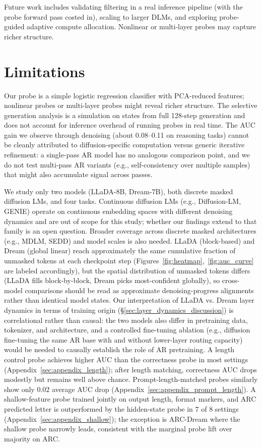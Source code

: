 \documentclass[11pt]{article}
\begin{document}
Future work includes validating filtering in a real inference pipeline (with the probe forward pass costed in), scaling to larger DLMs, and exploring probe-guided adaptive compute allocation.
Nonlinear or multi-layer probes may capture richer structure.

\section*{Limitations}

Our probe is a simple logistic regression classifier with PCA-reduced features; nonlinear probes or multi-layer probes might reveal richer structure.
The selective generation analysis is a simulation on states from full 128-step generation and does not account for inference overhead of running probes in real time.
The AUC gain we observe through denoising (about 0.08--0.11 on reasoning tasks) cannot be cleanly attributed to diffusion-specific computation versus generic iterative refinement: a single-pass AR model has no analogous comparison point, and we do not test multi-pass AR variants (e.g., self-consistency over multiple samples) that might also accumulate signal across passes.

We study only two models (LLaDA-8B, \mbox{Dream-7B}), both discrete masked diffusion LMs, and four tasks. Continuous diffusion LMs (e.g., Diffusion-LM, GENIE) operate on continuous embedding spaces with different denoising dynamics and are out of scope for this study; whether our findings extend to that family is an open question. Broader coverage across discrete masked architectures (e.g., MDLM, SEDD) and model scales is also needed.
LLaDA (block-based) and Dream (global linear) reach approximately the same cumulative fraction of unmasked tokens at each checkpoint step (Figures~\ref{fig:heatmap},~\ref{fig:auc_curve} are labeled accordingly), but the spatial distribution of unmasked tokens differs (LLaDA fills block-by-block, Dream picks most-confident globally), so cross-model comparisons should be read as approximate denoising-progress alignments rather than identical model states.
Our interpretation of LLaDA vs. Dream layer dynamics in terms of training origin (\S\ref{sec:layer_dynamics_discussion}) is correlational rather than causal: the two models also differ in pretraining data, tokenizer, and architecture, and a controlled fine-tuning ablation (e.g., diffusion fine-tuning the same AR base with and without lower-layer routing capacity) would be needed to causally establish the role of AR pretraining.
A length control probe achieves higher AUC than the correctness probe in most settings (Appendix~\ref{sec:appendix_length}); after length matching, correctness AUC drops modestly but remains well above chance. Prompt-length-matched probes similarly show only $0.02$ average AUC drop (Appendix~\ref{sec:appendix_prompt_length}). A shallow-feature probe trained jointly on output length, format markers, and ARC predicted letter is outperformed by the hidden-state probe in $7$ of $8$ settings (Appendix~\ref{sec:appendix_shallow}); the exception is \mbox{ARC-Dream} where the shallow probe narrowly leads, consistent with the marginal probe lift over majority on ARC.
\end{document}
